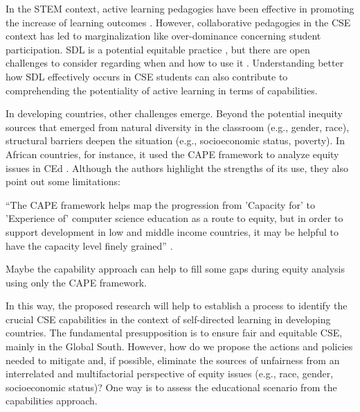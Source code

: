 In the \gls{STEM} context, active learning pedagogies have been effective in promoting the increase of learning outcomes \cite{prince:2004}. However, collaborative pedagogies in the \gls{CSE} context has led to marginalization \cite{lewis:2015} like over-dominance concerning student participation. \acrfull{SDL} is a potential equitable practice \cite{anderson:2022}, but there are open challenges to consider regarding when and how to use it \cite{brookfield:1993}. Understanding better how \gls{SDL} effectively occurs in \gls{CSE} students can also contribute to comprehending the potentiality of active learning in terms of capabilities.

In developing countries, other challenges emerge. Beyond the potential inequity sources that emerged from natural diversity in the classroom (e.g., gender, race), structural barriers deepen the situation (e.g., socioeconomic status, poverty). In African countries, for instance, it used the \gls{CAPE} framework to analyze equity issues in \gls{CEd} \cite{tshukudu:2023}. Although the authors highlight the strengths of its use, they also point out some limitations: 
\begin{citacao}
    ``The \gls{CAPE} framework helps map the progression from 'Capacity for' to 'Experience of' computer science education as a route to equity, but in order to support development in low and middle income countries, it may be helpful to have the capacity level finely grained'' \cite[p.~1]{tshukudu:2023}.
\end{citacao}
Maybe the capability approach can help to fill some gaps during equity analysis using only the \gls{CAPE} framework.

 In this way, the proposed research will help to establish a process to identify the crucial \gls{CSE} capabilities in the context of self-directed learning in developing countries. The fundamental presupposition is to ensure fair and equitable \gls{CSE}, mainly in the Global South. However, how do we propose the actions and policies needed to mitigate and, if possible, eliminate the sources of unfairness from an interrelated and multifactorial perspective of equity issues (e.g., race, gender, socioeconomic status)? One way is to assess the educational scenario from the capabilities approach.